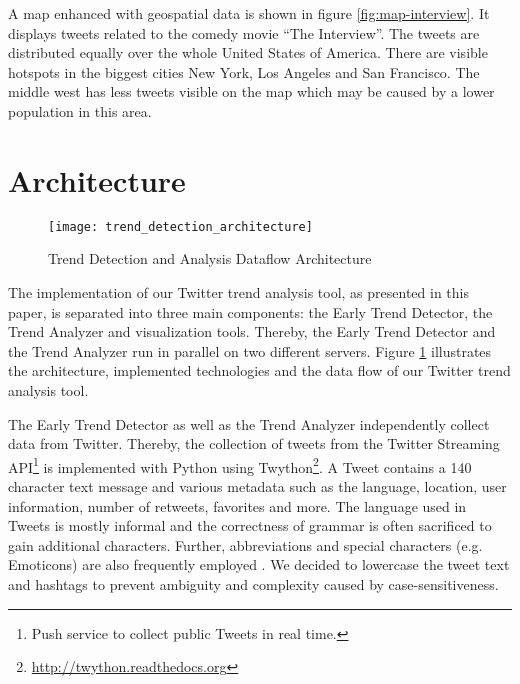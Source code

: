 A map enhanced with geospatial data is shown in figure \ref{fig:map-interview}. It displays tweets related to the comedy movie \enquote{The Interview}. The tweets are distributed equally over the whole United States of America. There are visible hotspots in the biggest cities New York, Los Angeles and San Francisco. The middle west has less tweets visible on the map which may be caused by a lower population in this area.

\section{Architecture}
\label{sec:architecture}

\begin{figure}[H]
  \centering
        \texttt{[image: trend\_detection\_architecture]}
  \caption[Trend Detection and Analysis Dataflow Architecture]{Trend Detection and Analysis Dataflow Architecture}
  \label{fig:twitter-trend-analysis-architecture}
\end{figure}


The implementation of our Twitter trend analysis tool, as presented in this paper, is separated into three main components: the Early Trend Detector, the Trend Analyzer and visualization tools. Thereby, the Early Trend Detector and the Trend Analyzer run in parallel on two different servers. Figure \ref{fig:twitter-trend-analysis-architecture} illustrates the architecture, implemented technologies and the data flow of our Twitter trend analysis tool.

The Early Trend Detector as well as the Trend Analyzer independently collect data from Twitter. Thereby, the collection of tweets from the Twitter Streaming API\footnote{Push service to collect public Tweets in real time.} is implemented with Python using Twython\footnote{\url{http://twython.readthedocs.org} \accessednote}. A Tweet contains a 140 character text message and various metadata such as the language, location, user information, number of retweets, favorites and more. The language used in Tweets is mostly informal and the correctness of grammar is often sacrificed to gain additional characters. Further, abbreviations and special characters (e.g. Emoticons) are also frequently employed \cite[67]{TwitterDataAnalytics2013}. We decided to lowercase the tweet text and hashtags to prevent ambiguity and complexity caused by case-sensitiveness. 

